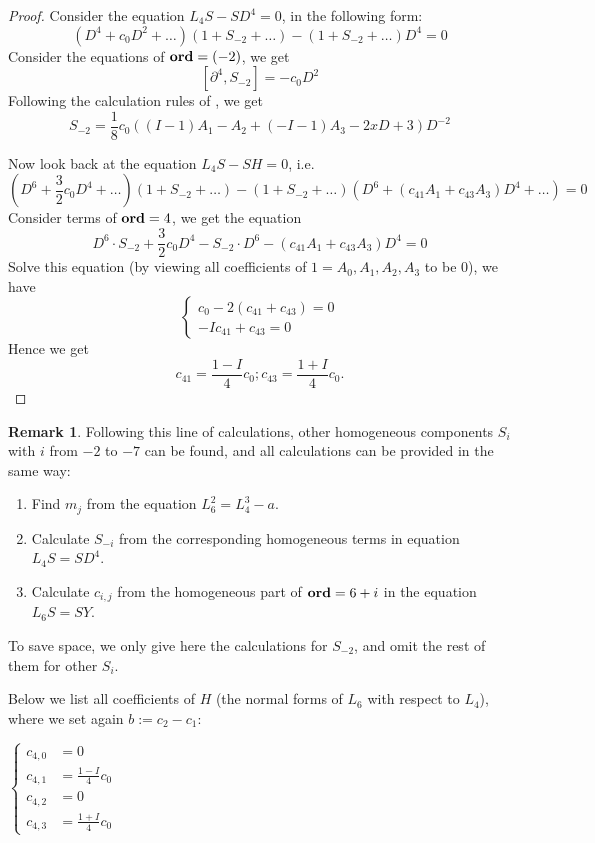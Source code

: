 \documentclass[11pt]{article}
\theoremstyle{definition}
\newtheorem{rem}{Remark}[section]
\theoremstyle{plain}
\numberwithin{equation}{section}
\newcommand{\Ord}{\mathop {\rm \bf ord}}
\begin{document}
\begin{proof}
Consider the equation $L_4S-SD^4=0$, in the following form:
	$$
	(D^4+c_0 D^2+\dots)(1+S_{-2}+\dots)-(1+S_{-2}+\dots)D^4=0
	$$
	Consider the equations of $\Ord =(-2)$, we get
	$$
	[\partial^4, S_{-2}]=-c_{0}D^2
	$$
	Following the calculation rules of  \cite[Lem. 2.5]{GZ24}, we get 
	$$
	S_{-2}=\frac{1}{8}c_0((I-1)A_1-A_2+(-I-1)A_3-2xD+3)D^{-2}
	$$

    Now  look back at the equation $L_4S-SH=0$, i.e. 
	$$
	(D^6+\frac{3}{2}c_0D^4+\dots)(1+S_{-2}+\dots)-(1+S_{-2}+\dots)(D^6+(c_{41}A_1+c_{43}A_3)D^4+\dots)=0
	$$
	Consider terms of $\Ord =4$, we get the equation
	$$
	D^6\cdot S_{-2}+\frac{3}{2}c_0D^4-S_{-2}\cdot D^6-(c_{41}A_1+c_{43}A_3)D^4=0
	$$
    Solve this equation (by viewing all coefficients of $1=A_0,A_1,A_2,A_3$ to be $0$), we have
	$$
	\begin{cases}
	c_0-2(c_{41}+c_{43})=0\\
	-Ic_{41}+c_{43}=0
	\end{cases}
	$$
	Hence we get 
	$$
	c_{41} = \frac{1 - I}{4} c_0;c_{43} =\frac{1 + I}{4} c_0. 
	$$
\end{proof}

\begin{rem}
	 Following this line of calculations, other homogeneous components $S_{i}$ with $i$ from $-2$ to $-7$ can be found,  and all calculations can be provided in the same way:
	\begin{enumerate}
		\item Find $m_{j}$ from the equation $L_6^2=L_4^3-a$.
		\item Calculate $S_{-i}$ from the corresponding homogeneous terms in equation $L_4S=SD^4$.
		\item Calculate $c_{i,j} $ from the homogeneous part of $\Ord=6+i$ in the equation $L_6S=SY$.
	\end{enumerate}
    To save space, we only give here the calculations for $S_{-2}$, and omit the rest of them for other $S_{i}$.

\end{rem}

Below we list all coefficients of $H$ (the normal forms of $L_6$ with respect to $L_4$), where we set again $b:=c_2-c_1$: 

$
\left\{\begin{aligned}
c_{4,0}&=0\\
c_{4,1}&=\frac{1-I}{4} c_0\\
c_{4,2}&=0\\
c_{4,3}&=\frac{1+I}{4} c_0 
\end{aligned}
\right.
$
\end{document}
